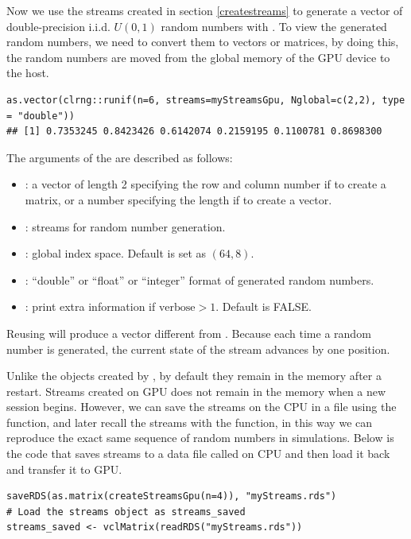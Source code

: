 \documentclass[article,nojss]{jss}\usepackage[]{graphicx}\usepackage[]{color}
\makeatletter
\newenvironment{kframe}{%
 \def\at@end@of@kframe{}%
 \ifinner\ifhmode%
  \def\at@end@of@kframe{\end{minipage}}%
  \begin{minipage}{\columnwidth}%
 \fi\fi%
 \def\FrameCommand##1{\hskip\@totalleftmargin \hskip-\fboxsep
 \colorbox{shadecolor}{##1}\hskip-\fboxsep
     \hskip-\linewidth \hskip-\@totalleftmargin \hskip\columnwidth}%
 \MakeFramed {\advance\hsize-\width
   \@totalleftmargin\z@ \linewidth\hsize
   \@setminipage}}%
 {\par\unskip\endMakeFramed%
 \at@end@of@kframe}
\newenvironment{knitrout}{}{} %
\newcommand{\fct}[1]{\code{#1()}}
\makeatother
\begin{document}
Now we use the streams created in section \ref{createstreams} to generate a vector of double-precision i.i.d. $U(0,1)$ random numbers with \fct{clrng::runif}. To view the generated random numbers, we need to convert them to  vectors or matrices, by doing this, the random numbers are moved from the global memory of the GPU device to the host.
\begin{knitrout}
\color{fgcolor}\begin{kframe}
\begin{verbatim}
as.vector(clrng::runif(n=6, streams=myStreamsGpu, Nglobal=c(2,2), type = "double"))
## [1] 0.7353245 0.8423426 0.6142074 0.2159195 0.1100781 0.8698300
\end{verbatim}
\end{kframe}
\end{knitrout}
The arguments of the \fct{clrng::runif} are described as follows:
\begin{itemize}
\itemsep0em 
  \item {}: a vector of length 2 specifying the row and column number if to create a matrix, or a number specifying the length if to create a vector.
  \item {}: streams for random number generation.
  \item {}: global index space. Default is set as $(64,8)$.
  \item {}: ``double'' or ``float'' or ``integer'' format of generated random numbers.
  \item {}: print extra information if $\text{verbose} > 1$. Default is FALSE.
\end{itemize}
Reusing  will produce a vector different from . Because each time a random number is generated, the current state of the stream advances by one position. %

Unlike the objects created by , by default they remain in the memory after a restart. Streams created on GPU does not remain in the memory when a new  session begins. However, we can save the streams on the CPU in a file using the \fct{saveRDS} function, and later recall the streams with the \fct{readRDS} function, in this way we can reproduce the exact same sequence of random numbers in simulations. Below is the code that saves streams to a data file called  on CPU and then load it back and transfer it to GPU.
\begin{knitrout}
\color{fgcolor}\begin{kframe}
\begin{verbatim}
saveRDS(as.matrix(createStreamsGpu(n=4)), "myStreams.rds")
# Load the streams object as streams_saved
streams_saved <- vclMatrix(readRDS("myStreams.rds"))
\end{verbatim}
\end{kframe}
\end{knitrout}
\end{document}
